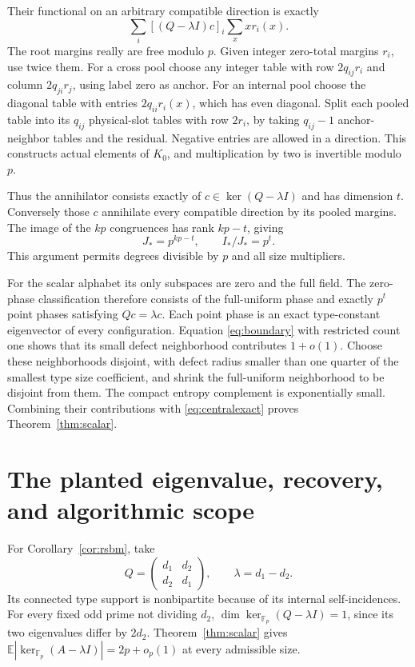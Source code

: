 \documentclass[11pt]{article}
\newcommand{\Fp}{\mathbb F_p}
\newcommand{\E}{\mathbb E}
\begin{document}
Their functional on an arbitrary compatible direction is exactly
\[
 \sum_i[(Q-\lambda I)c]_i\sum_x x r_i(x).
\]
The root margins really are free modulo $p$. Given integer zero-total margins $r_i$, use twice them. For a cross pool choose any integer table with row $2q_{ij}r_i$ and column $2q_{ji}r_j$, using label zero as anchor. For an internal pool choose the diagonal table with entries $2q_{ii}r_i(x)$, which has even diagonal. Split each pooled table into its $q_{ij}$ physical-slot tables with row $2r_i$, by taking $q_{ij}-1$ anchor-neighbor tables and the residual. Negative entries are allowed in a direction. This constructs actual elements of $K_0$, and multiplication by two is invertible modulo $p$.

Thus the annihilator consists exactly of $c\in\ker(Q-\lambda I)$ and has dimension $t$. Conversely those $c$ annihilate every compatible direction by its pooled margins. The image of the $kp$ congruences has rank $kp-t$, giving
\[
 J_*=p^{kp-t},\qquad I_*/J_*=p^t.
\]
This argument permits degrees divisible by $p$ and all size multipliers.

For the scalar alphabet its only subspaces are zero and the full field. The zero-phase classification therefore consists of the full-uniform phase and exactly $p^t$ point phases satisfying $Qc=\lambda c$. Each point phase is an exact type-constant eigenvector of every configuration. Equation \eqref{eq:boundary} with restricted count one shows that its small defect neighborhood contributes $1+o(1)$. Choose these neighborhoods disjoint, with defect radius smaller than one quarter of the smallest type size coefficient, and shrink the full-uniform neighborhood to be disjoint from them. The compact entropy complement is exponentially small. Combining their contributions with \eqref{eq:centralexact} proves Theorem~\ref{thm:scalar}.

\section{The planted eigenvalue, recovery, and algorithmic scope}
For Corollary~\ref{cor:rsbm}, take
\[
 Q=\begin{pmatrix}d_1&d_2\\d_2&d_1\end{pmatrix},
 \qquad\lambda=d_1-d_2.
\]
Its connected type support is nonbipartite because of its internal self-incidences. For every fixed odd prime not dividing $d_2$, $\dim\ker_{\Fp}(Q-\lambda I)=1$, since its two eigenvalues differ by $2d_2$. Theorem~\ref{thm:scalar} gives $\E|\ker_{\Fp}(A-\lambda I)|=2p+o_p(1)$ at every admissible size.
\end{document}
